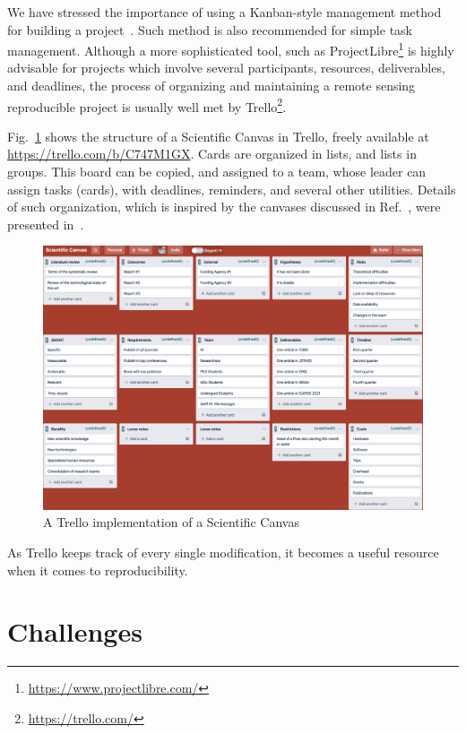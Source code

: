 \documentclass[journal,twoside]{IEEEtran}
\begin{document}
We have stressed the importance of using a Kanban-style management method for building a project~\cite{SuccessfulScientificPublishingfromtheProjecttotheAdvertising}.
Such method is also recommended for simple task management.
Although a more sophisticated tool, such as ProjectLibre\footnote{\url{https://www.projectlibre.com/}} is highly advisable for projects which involve several participants, resources, deliverables, and deadlines, the process of organizing and maintaining a remote sensing reproducible project is usually well met by Trello\footnote{\url{https://trello.com/}}.

Fig.~\ref{Fig:ScientificCanvas} shows the structure of a Scientific Canvas in Trello, freely available at \url{https://trello.com/b/C747M1GX}.
Cards are organized in lists, and lists in groups.
This board can be copied, and assigned to a team, whose leader can assign tasks (cards), with deadlines, reminders, and several other utilities.
Details of such organization, which is inspired by the canvases discussed in Ref.~\cite{osterwalder2010business}, were presented in~\cite{SuccessfulScientificPublishingfromtheProjecttotheAdvertising}.

\begin{figure}[hbt]
\centering
\includegraphics[width=\linewidth]{ScientificCanvas}
\caption{A Trello implementation of a Scientific Canvas}\label{Fig:ScientificCanvas}
\end{figure}

As Trello keeps track of every single modification, it becomes a useful resource when it comes to reproducibility.

\section{Challenges}
\end{document}
